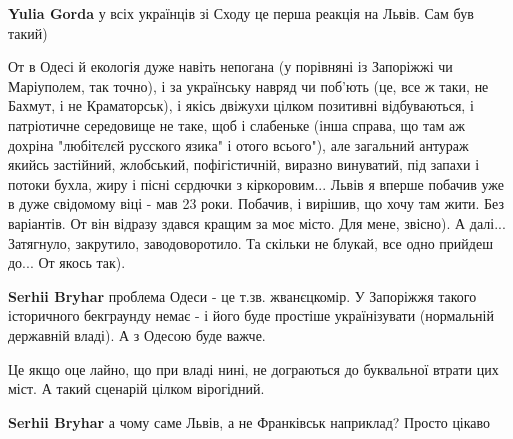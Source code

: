 \begin{itemize}
\begin{itemize}
\textbf{Yulia Gorda} у всіх українців зі Сходу це перша реакція на Львів. Сам був такий)

 

От в Одесі й екологія дуже навіть непогана (у порівняні із Запоріжжі чи
Маріуполем, так точно), і за українську навряд чи поб'ють (це, все ж таки, не
Бахмут, і не Краматорськ), і якісь двіжухи цілком позитивні відбуваються, і
патріотичне середовище не таке, щоб і слабеньке (інша справа, що там аж дохріна
"любітєлєй русского язика" і отого всього"), але загальний антураж якийсь
застійний, жлобський, пофігістичній, виразно винуватий, під запахи і потоки
бухла, жиру і пісні сєрдючки з кіркоровим... Львів я вперше побачив уже в дуже
свідомому віці - мав 23 роки. Побачив, і вирішив, що хочу там жити. Без
варіантів. От він відразу здався кращим за моє місто. Для мене, звісно). А
далі... Затягнуло, закрутило, заводоворотило. Та скільки не блукай, все одно
прийдеш до... От якось так).

 
\textbf{Serhii Bryhar} проблема Одеси - це т.зв. жванєцкомір. У Запоріжжя такого історичного бекграунду немає - і його буде простіше українізувати (нормальній державній владі). А з Одесою буде важче.

 
Це якщо оце лайно, що при владі нині, не дограються до буквальної втрати цих міст. А такий сценарій цілком вірогідний.

 
\textbf{Serhii Bryhar} а чому саме Львів, а не Франківськ наприклад? Просто цікаво


\end{itemize}
\end{itemize}
